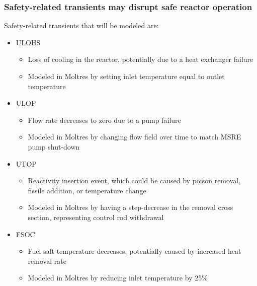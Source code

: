 \begin{frame}
  \frametitle{Safety-related transients may disrupt safe reactor operation}
    \begin{block}{Safety-related transients that will be modeled are:}
        \begin{itemize}
            \item \Gls{ULOHS}
            \begin{itemize}
                \item Loss of cooling in the reactor, potentially due to a heat exchanger failure
                \item Modeled in Moltres by setting inlet temperature equal to outlet temperature
            \end{itemize}
            \item \Gls{ULOF}
            \begin{itemize}
                \item Flow rate decreases to zero due to a pump failure
                \item Modeled in Moltres by changing flow field over time to match \gls{MSRE} pump shut-down
            \end{itemize}
            \item \Gls{UTOP}
            \begin{itemize}
                \item Reactivity insertion event, which could be caused by poison removal, fissile addition, or temperature change
                \item Modeled in Moltres by having a step-decrease in the removal cross section, representing control rod withdrawal
            \end{itemize}
            \item \Gls{FSOC}
            \begin{itemize}
                \item Fuel salt temperature decreases, potentially caused by increased heat removal rate
                \item Modeled in Moltres by reducing inlet temperature by 25\%
            \end{itemize}
        \end{itemize}
    \end{block}
\end{frame}


